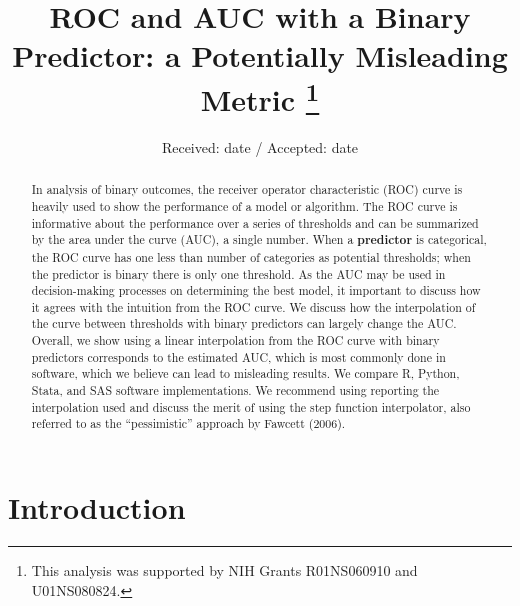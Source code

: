\documentclass[smallextended]{svjour3}       %
\begin{document}
\title{ROC and AUC with a Binary Predictor: a Potentially Misleading Metric \thanks{This analysis was supported by NIH Grants R01NS060910 and U01NS080824.} }



\author{  }


\institute{
    }

\date{Received: date / Accepted: date}


\maketitle

\begin{abstract}
In analysis of binary outcomes, the receiver operator characteristic
(ROC) curve is heavily used to show the performance of a model or
algorithm. The ROC curve is informative about the performance over a
series of thresholds and can be summarized by the area under the curve
(AUC), a single number. When a \textbf{predictor} is categorical, the
ROC curve has one less than number of categories as potential
thresholds; when the predictor is binary there is only one threshold. As
the AUC may be used in decision-making processes on determining the best
model, it important to discuss how it agrees with the intuition from the
ROC curve. We discuss how the interpolation of the curve between
thresholds with binary predictors can largely change the AUC. Overall,
we show using a linear interpolation from the ROC curve with binary
predictors corresponds to the estimated AUC, which is most commonly done
in software, which we believe can lead to misleading results. We compare
R, Python, Stata, and SAS software implementations. We recommend using
reporting the interpolation used and discuss the merit of using the step
function interpolator, also referred to as the ``pessimistic'' approach
by Fawcett (2006).
\\


\end{abstract}


\def\spacingset#1{\renewcommand{\baselinestretch}%
{#1}\small\normalsize} \spacingset{1}




\hypertarget{introduction}{%
\section{Introduction}\label{introduction}}
\end{document}
